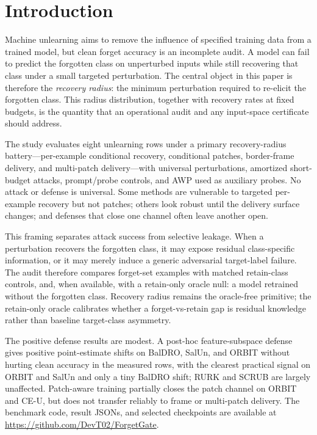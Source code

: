 \documentclass[11pt]{article}
\begin{document}
\begin{abstract}
provably narrows it on the audited axis. Code, result JSONs, and selected checkpoints are available at \url{https://github.com/DevT02/ForgetGate}.
\end{abstract}

\section{Introduction}
Machine unlearning aims to remove the influence of specified training data from a trained model, but clean forget accuracy is an incomplete audit. A model can fail to predict the forgotten class on unperturbed inputs while still recovering that class under a small targeted perturbation. The central object in this paper is therefore the \emph{recovery radius}: the minimum perturbation required to re-elicit the forgotten class. This radius distribution, together with recovery rates at fixed budgets, is the quantity that an operational audit and any input-space certificate should address.

The study evaluates eight unlearning rows under a primary recovery-radius battery---per-example conditional recovery, conditional patches, border-frame delivery, and multi-patch delivery---with universal perturbations, amortized short-budget attacks, prompt/probe controls, and AWP used as auxiliary probes. No attack or defense is universal. Some methods are vulnerable to targeted per-example recovery but not patches; others look robust until the delivery surface changes; and defenses that close one channel often leave another open.

This framing separates attack success from selective leakage. When a perturbation recovers the forgotten class, it may expose residual class-specific information, or it may merely induce a generic adversarial target-label failure. The audit therefore compares forget-set examples with matched retain-class controls, and, when available, with a retain-only oracle null: a model retrained without the forgotten class. Recovery radius remains the oracle-free primitive; the retain-only oracle calibrates whether a forget-vs-retain gap is residual knowledge rather than baseline target-class asymmetry.

The positive defense results are modest. A post-hoc feature-subspace defense gives positive point-estimate shifts on BalDRO, SalUn, and ORBIT without hurting clean accuracy in the measured rows, with the clearest practical signal on ORBIT and SalUn and only a tiny BalDRO shift; RURK and SCRUB are largely unaffected. Patch-aware training partially closes the patch channel on ORBIT and CE-U, but does not transfer reliably to frame or multi-patch delivery. The benchmark code, result JSONs, and selected checkpoints are available at \url{https://github.com/DevT02/ForgetGate}.
\end{document}
